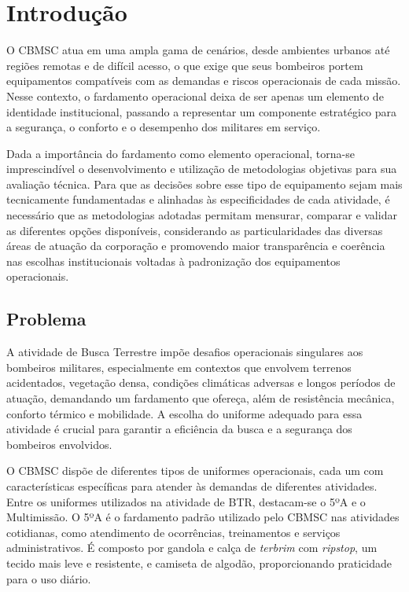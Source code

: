 \chapter{Introdução}



	    O \acrfull{CBMSC} atua em uma ampla gama de cenários, desde ambientes urbanos até 
		regiões remotas e de difícil acesso, o que exige que seus bombeiros portem equipamentos 
		compatíveis com as demandas e riscos operacionais de cada missão. Nesse contexto, o 
		fardamento operacional deixa de ser apenas um elemento de identidade institucional, passando 
		a representar um componente estratégico para a segurança, o conforto e o desempenho dos 
		militares em serviço.

    	Dada a importância do fardamento como elemento operacional, torna-se imprescindível o 
		desenvolvimento e utilização de metodologias objetivas para sua avaliação técnica. 
		Para que as decisões sobre esse tipo de equipamento sejam mais tecnicamente fundamentadas e 
		alinhadas às especificidades de cada atividade, é necessário que as metodologias adotadas 
		permitam mensurar, comparar e validar as diferentes opções disponíveis, considerando as 
		particularidades das diversas áreas de atuação da corporação e promovendo maior transparência 
		e coerência nas escolhas institucionais voltadas à padronização dos equipamentos operacionais.

	\section{Problema}

		A atividade de Busca Terrestre impõe desafios operacionais singulares aos bombeiros militares,
		 especialmente em contextos que envolvem terrenos acidentados, vegetação densa, condições climáticas 
		 adversas e longos períodos de atuação, demandando um fardamento que ofereça, além de resistência mecânica, conforto térmico e mobilidade.  
		A escolha do uniforme adequado para essa atividade é crucial para garantir a eficiência da busca e a segurança dos bombeiros envolvidos.

		O \acrshort{CBMSC} dispõe de diferentes tipos de uniformes operacionais, cada um com características específicas para atender
		às demandas de diferentes atividades.  Entre os uniformes utilizados na atividade de \acrfull{BTR}, destacam-se o 5ºA e o Multimissão.
		O 5ºA é o fardamento padrão utilizado pelo \acrshort{CBMSC} nas atividades cotidianas, como atendimento de ocorrências,
		treinamentos e serviços administrativos. É composto por gandola e calça de \textit{terbrim} com \textit{ripstop}, um tecido mais leve e 
		resistente, e camiseta de algodão, proporcionando praticidade para o uso diário.


